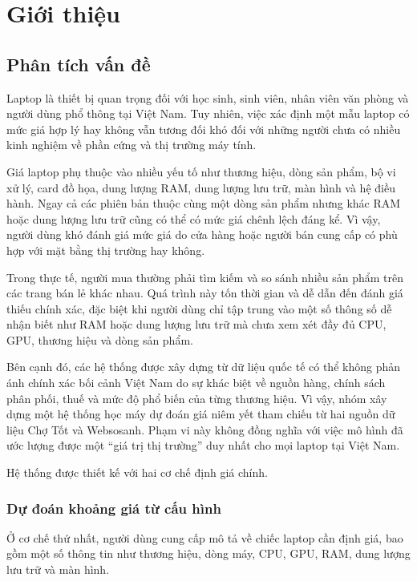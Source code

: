 \section{Giới thiệu}

\subsection{Phân tích vấn đề}

Laptop là thiết bị quan trọng đối với học sinh, sinh viên, nhân viên văn phòng và người dùng phổ thông tại Việt Nam. Tuy nhiên, việc xác định một mẫu laptop có mức giá hợp lý hay không vẫn tương đối khó đối với những người chưa có nhiều kinh nghiệm về phần cứng và thị trường máy tính.

Giá laptop phụ thuộc vào nhiều yếu tố như thương hiệu, dòng sản phẩm, bộ vi xử lý, card đồ họa, dung lượng RAM, dung lượng lưu trữ, màn hình và hệ điều hành. Ngay cả các phiên bản thuộc cùng một dòng sản phẩm nhưng khác RAM hoặc dung lượng lưu trữ cũng có thể có mức giá chênh lệch đáng kể. Vì vậy, người dùng khó đánh giá mức giá do cửa hàng hoặc người bán cung cấp có phù hợp với mặt bằng thị trường hay không.

Trong thực tế, người mua thường phải tìm kiếm và so sánh nhiều sản phẩm trên các trang bán lẻ khác nhau. Quá trình này tốn thời gian và dễ dẫn đến đánh giá thiếu chính xác, đặc biệt khi người dùng chỉ tập trung vào một số thông số dễ nhận biết như RAM hoặc dung lượng lưu trữ mà chưa xem xét đầy đủ CPU, GPU, thương hiệu và dòng sản phẩm.

Bên cạnh đó, các hệ thống được xây dựng từ dữ liệu quốc tế có thể không phản ánh chính xác bối cảnh Việt Nam do sự khác biệt về nguồn hàng, chính sách phân phối, thuế và mức độ phổ biến của từng thương hiệu. Vì vậy, nhóm xây dựng một hệ thống học máy dự đoán giá niêm yết tham chiếu từ hai nguồn dữ liệu Chợ Tốt và Websosanh. Phạm vi này không đồng nghĩa với việc mô hình đã ước lượng được một ``giá trị thị trường'' duy nhất cho mọi laptop tại Việt Nam.

Hệ thống được thiết kế với hai cơ chế định giá chính.

\subsubsection{Dự đoán khoảng giá từ cấu hình}

Ở cơ chế thứ nhất, người dùng cung cấp mô tả về chiếc laptop cần định giá, bao gồm một số thông tin như thương hiệu, dòng máy, CPU, GPU, RAM, dung lượng lưu trữ và màn hình.

